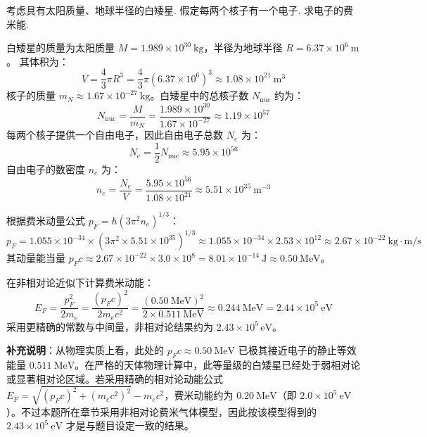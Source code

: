 \begin{exercise}\label{ex:27.7}
考虑具有太阳质量、地球半径的白矮星. 假定每两个核子有一个电子. 求电子的费米能.
\end{exercise}
\begin{solution}
白矮星的质量为太阳质量 $M = 1.989 \times 10^{30} \ \mathrm{kg}$，半径为地球半径 $R = 6.37 \times 10^6 \ \mathrm{m}$。
其体积为：
$$ V = \frac{4}{3} \pi R^3 = \frac{4}{3} \pi (6.37 \times 10^6)^3 \approx 1.08 \times 10^{21} \ \mathrm{m^3} $$
核子的质量 $m_N \approx 1.67 \times 10^{-27} \ \mathrm{kg}$。白矮星中的总核子数 $N_{\mathrm{nuc}}$ 约为：
$$ N_{\mathrm{nuc}} = \frac{M}{m_N} = \frac{1.989 \times 10^{30}}{1.67 \times 10^{-27}} \approx 1.19 \times 10^{57} $$
每两个核子提供一个自由电子，因此自由电子总数 $N_e$ 为：
$$ N_e = \frac{1}{2} N_{\mathrm{nuc}} \approx 5.95 \times 10^{56} $$
自由电子的数密度 $n_e$ 为：
$$ n_e = \frac{N_e}{V} = \frac{5.95 \times 10^{56}}{1.08 \times 10^{21}} \approx 5.51 \times 10^{35} \ \mathrm{m^{-3}} $$

根据费米动量公式 $p_F = \hbar(3\pi^2 n_e)^{1/3}$：
$$ p_F = 1.055 \times 10^{-34} \times (3 \pi^2 \times 5.51 \times 10^{35})^{1/3} \approx 1.055 \times 10^{-34} \times 2.53 \times 10^{12} \approx 2.67 \times 10^{-22} \ \mathrm{kg \cdot m/s} $$
其动量能当量 $p_F c \approx 2.67 \times 10^{-22} \times 3.0 \times 10^8 = 8.01 \times 10^{-14} \ \mathrm{J} \approx 0.50 \ \mathrm{MeV}$。

在非相对论近似下计算费米动能：
$$ E_F = \frac{p_F^2}{2m_e} = \frac{(p_F c)^2}{2 m_e c^2} = \frac{(0.50 \ \mathrm{MeV})^2}{2 \times 0.511 \ \mathrm{MeV}} \approx 0.244 \ \mathrm{MeV} = 2.44 \times 10^5 \ \mathrm{eV} $$
采用更精确的常数与中间量，非相对论结果约为 $2.43\times10^5\,\mathrm{eV}$。

\textbf{补充说明}：从物理实质上看，此处的 $p_F c \approx 0.50 \ \mathrm{MeV}$ 已极其接近电子的静止等效能量 $0.511 \ \mathrm{MeV}$。在严格的天体物理计算中，此等量级的白矮星已经处于弱相对论或显著相对论区域。若采用精确的相对论动能公式 $E_F = \sqrt{(p_F c)^2 + (m_e c^2)^2} - m_e c^2$，费米动能约为 $0.20 \ \mathrm{MeV}$（即 $2.0 \times 10^5 \ \mathrm{eV}$）。不过本题所在章节采用非相对论费米气体模型，因此按该模型得到的 $2.43 \times 10^5 \ \mathrm{eV}$ 才是与题目设定一致的结果。
\end{solution}

